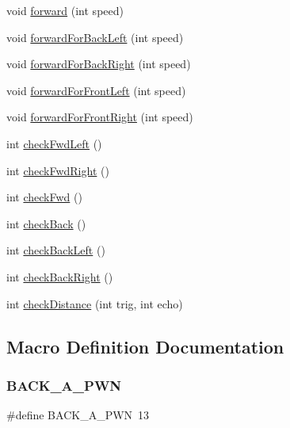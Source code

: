 \begin{DoxyCompactItemize}
\item 
void \hyperlink{car_8ino_a1ad7d08045323c724751d2db3c0349d6}{forward} (int speed)
\item 
void \hyperlink{car_8ino_a114907bb25a227c7815fdf0f7fe9e7a2}{forward\+For\+Back\+Left} (int speed)
\item 
void \hyperlink{car_8ino_ac5a4a877a2ec86535ec734dfe82e1e26}{forward\+For\+Back\+Right} (int speed)
\item 
void \hyperlink{car_8ino_a43a8c2c3049fc50d921a6f6b5fe5cda7}{forward\+For\+Front\+Left} (int speed)
\item 
void \hyperlink{car_8ino_a350b91f1aa7e8d8d431d1243f5de8ce2}{forward\+For\+Front\+Right} (int speed)
\item 
int \hyperlink{car_8ino_a68a65fca2a14cfa8a8c98f11e6f75d98}{check\+Fwd\+Left} ()
\item 
int \hyperlink{car_8ino_a18eac13eef94645c75ea3e5b2464d197}{check\+Fwd\+Right} ()
\item 
int \hyperlink{car_8ino_ad38f4b26a5e3293787a6d4c7bd4d1e6f}{check\+Fwd} ()
\item 
int \hyperlink{car_8ino_a67c46e128339bcaf0c044d085cf708ce}{check\+Back} ()
\item 
int \hyperlink{car_8ino_a171443d8ec5e6f6ba918a182a909ffcf}{check\+Back\+Left} ()
\item 
int \hyperlink{car_8ino_ab0f5a07df3f52892a9140ec6b8d1622f}{check\+Back\+Right} ()
\item 
int \hyperlink{car_8ino_a74e32c456d4ea8fb25c0087eb4b01b00}{check\+Distance} (int trig, int echo)
\end{DoxyCompactItemize}


\subsection{Macro Definition Documentation}
\mbox{\label{car_8ino_afdb8a33d60147799dac8fbb339510734}} 
\subsubsection{\texorpdfstring{B\+A\+C\+K\+\_\+\+A\+\_\+\+P\+WN}{BACK\_A\_PWN}}
{\footnotesize\ttfamily \#define B\+A\+C\+K\+\_\+\+A\+\_\+\+P\+WN~13}

\mbox{\label{car_8ino_a367d04e137f931b359091a61cdbb3c29}} 
